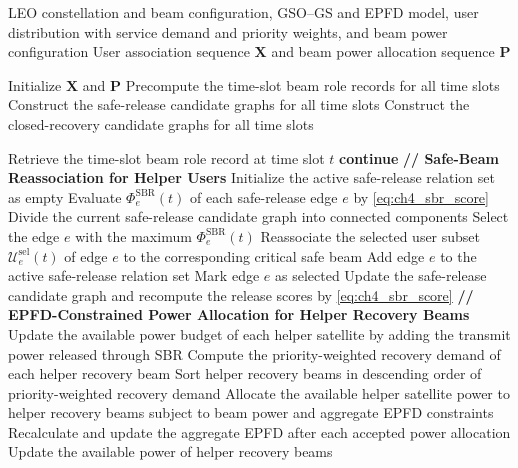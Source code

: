 \begin{algorithm}[H]
\caption{Overall Procedure of EPFD-Aware Beam Reassociation for Service Recovery}
\label{alg:ch4_overall}
\scriptsize
\begin{algorithmic}[1]
\Require LEO constellation and beam configuration, GSO--GS and EPFD model, user distribution with service demand and priority weights, and beam power configuration
\Ensure User association sequence $\mathbf{X}$ and beam power allocation sequence $\mathbf{P}$

\State Initialize $\mathbf{X}$ and $\mathbf{P}$
\State Precompute the time-slot beam role records for all time slots
\State Construct the safe-release candidate graphs for all time slots
\State Construct the closed-recovery candidate graphs for all time slots

    \State Retrieve the time-slot beam role record at time slot $t$
        \State \textbf{continue}
    \EndIf
    \State \textbf{// Safe-Beam Reassociation for Helper Users}
    \State Initialize the active safe-release relation set as empty
    \State Evaluate $\Phi_e^{\mathrm{SBR}}(t)$ of each safe-release edge $e$ by \eqref{eq:ch4_sbr_score}
        \State Divide the current safe-release candidate graph into connected components
            \State Select the edge $e$ with the maximum $\Phi_e^{\mathrm{SBR}}(t)$
            \State Reassociate the selected user subset $\mathcal{U}_e^{\mathrm{sel}}(t)$ of edge $e$ to the corresponding critical safe beam
            \State Add edge $e$ to the active safe-release relation set
            \State Mark edge $e$ as selected
        \EndFor
        \State Update the safe-release candidate graph and recompute the release scores by \eqref{eq:ch4_sbr_score}
    \EndWhile
    \State \textbf{// EPFD-Constrained Power Allocation for Helper Recovery Beams}
    \State Update the available power budget of each helper satellite by adding the transmit power released through SBR
    \State Compute the priority-weighted recovery demand of each helper recovery beam
    \State Sort helper recovery beams in descending order of priority-weighted recovery demand
    \State Allocate the available helper satellite power to helper recovery beams subject to beam power and aggregate EPFD constraints
    \State Recalculate and update the aggregate EPFD after each accepted power allocation
    \State Update the available power of helper recovery beams

\end{algorithmic}
\end{algorithm}
